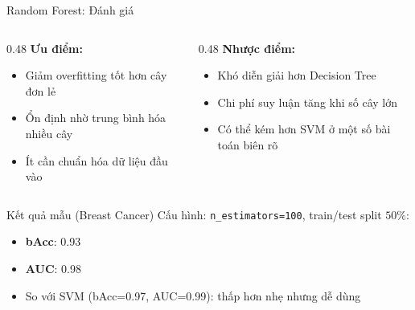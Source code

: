 \begin{frame}[shrink=10]{Random Forest: Đánh giá}
    \begin{columns}[T]
        \begin{column}{0.48\textwidth}
            \textbf{Ưu điểm:}
            \begin{itemize}
                \item Giảm overfitting tốt hơn cây đơn lẻ
                \item Ổn định nhờ trung bình hóa nhiều cây
                \item Ít cần chuẩn hóa dữ liệu đầu vào
            \end{itemize}
        \end{column}
        \begin{column}{0.48\textwidth}
            \textbf{Nhược điểm:}
            \begin{itemize}
                \item Khó diễn giải hơn Decision Tree
                \item Chi phí suy luận tăng khi số cây lớn
                \item Có thể kém hơn SVM ở một số bài toán biên rõ
            \end{itemize}
        \end{column}
    \end{columns}

    \begin{alertblock}{Kết quả mẫu (Breast Cancer)}
        Cấu hình: \texttt{n\_estimators=100}, train/test split $50\%$:
        \begin{itemize}
            \item \textbf{bAcc}: 0.93
            \item \textbf{AUC}: 0.98
            \item So với SVM (bAcc=0.97, AUC=0.99): thấp hơn nhẹ nhưng dễ dùng
        \end{itemize}
    \end{alertblock}

    \hfill{\scriptsize \cite{duchesnay2021statsml}}
\end{frame}

